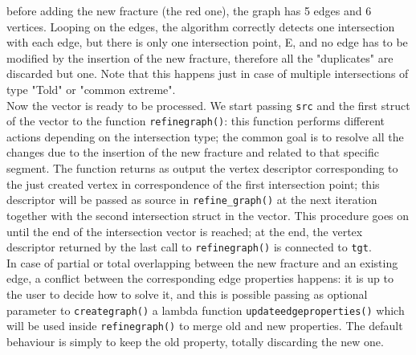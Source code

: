 \documentclass[10pt]{article} %
\begin{document}
	before adding the new fracture (the red one), the graph has 5 edges and 6 vertices. Looping on the edges, the algorithm correctly detects one intersection with each edge, but there is only one intersection point, E, and no edge has to be modified by the insertion of the new fracture, therefore all the "duplicates" are discarded but one. Note that this happens just in case of multiple intersections of type "Told" or "common extreme". \\
	Now the vector is ready to be processed. We start passing  \texttt{src} and the first struct of the vector to the function \texttt{refine\textunderscore graph()}: this function performs different actions depending on the intersection type; the common goal is to resolve all the changes due to the insertion of the new fracture and related to that specific segment. The function returns as output the vertex descriptor corresponding to the just created vertex in correspondence of the first intersection point; this descriptor will be passed as source in \texttt{refine\_graph()} at the next iteration together with the second intersection struct in the vector. This procedure goes on until the end of the intersection vector is reached; at the end, the vertex descriptor returned by the last call to \texttt{refine\textunderscore graph()} is connected to \texttt{tgt}. \\
	In case of partial or total overlapping between the new fracture and an existing edge, a conflict between the corresponding edge properties happens: it is up to the user to decide how to solve it, and this is possible passing as optional parameter to \texttt{create\textunderscore graph()} a lambda function \texttt{update\textunderscore edge\textunderscore properties()} which will be used inside \texttt{refine\textunderscore graph()} to merge old and new properties. The default behaviour is simply to keep the old property, totally discarding the new one.
	
\end{document}

